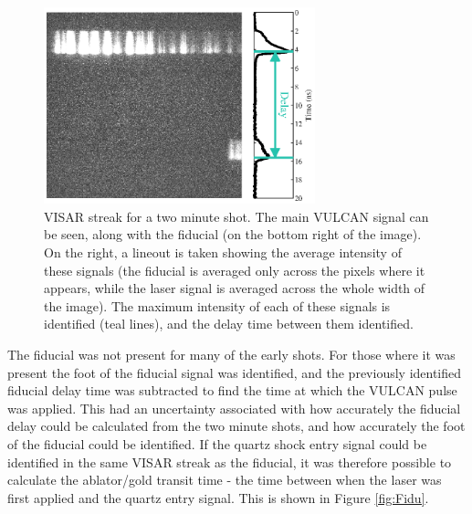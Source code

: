 \begin{figure} [h!]
\begin{centering}
\includegraphics[width=0.7\textwidth]{figures/Experiment/TwoMinute.eps}%
\caption{\label{fig:Two Minute} VISAR streak for a two minute shot. The main VULCAN signal can be seen, along with the fiducial (on the bottom right of the image). On the right, a lineout is taken showing the average intensity of these signals (the fiducial is averaged only across the pixels where it appears, while the laser signal is averaged across the whole width of the image). The maximum intensity of each of these signals is identified (teal lines), and the delay time between them identified.}
\end{centering}
\end{figure}

The fiducial was not present for many of the early shots. For those where it was present the foot of the fiducial signal was identified, and the previously identified fiducial delay time was subtracted to find the time at which the VULCAN pulse was applied. This had an uncertainty associated with how accurately the fiducial delay could be calculated from the two minute shots, and how accurately the foot of the fiducial could be identified. If the quartz shock entry signal could be identified in the same VISAR streak as the fiducial, it was therefore possible to calculate the ablator/gold transit time - the time between when the laser was first applied and the quartz entry signal. This is shown in Figure \ref{fig:Fidu}. 

